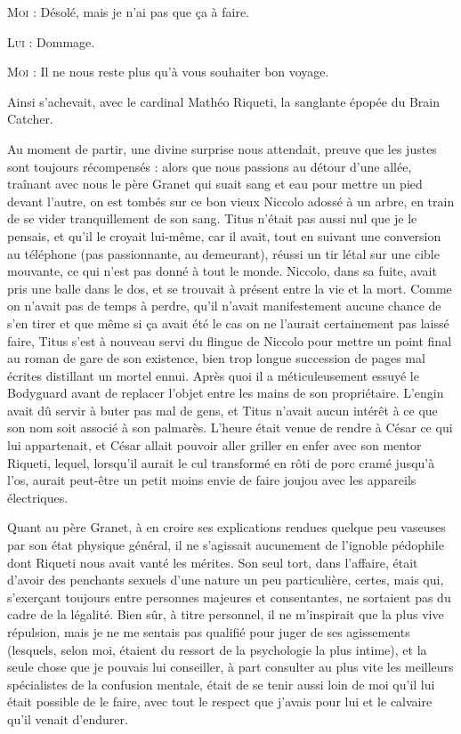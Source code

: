 \textsc{Moi} : Désolé, mais je n’ai pas que ça à faire.

\textsc{Lui} : Dommage.

\textsc{Moi} : Il ne nous reste plus qu’à vous souhaiter bon voyage.

Ainsi s’achevait, avec le cardinal Mathéo Riqueti, la sanglante épopée du Brain Catcher.

Au moment de partir, une divine surprise nous attendait, preuve que les justes sont toujours récompensés : alors que nous passions au détour d’une allée, traînant avec nous le père Granet qui suait sang et eau pour mettre un pied devant l’autre, on est tombés sur ce bon vieux Niccolo adossé à un arbre, en train de se vider tranquillement de son sang. Titus n’était pas aussi nul que je le pensais, et qu’il le croyait lui-même, car il avait, tout en suivant une conversion au téléphone (pas passionnante, au demeurant), réussi un tir létal sur une cible mouvante, ce qui n’est pas donné à tout le monde. Niccolo, dans sa fuite, avait pris une balle dans le dos, et se trouvait à présent entre la vie et la mort. Comme on n’avait pas de temps à perdre, qu’il n’avait manifestement aucune chance de s’en tirer et que même si ça avait été le cas on ne l’aurait certainement pas laissé faire, Titus s’est à nouveau servi du flingue de Niccolo pour mettre un point final au roman de gare de son existence, bien trop longue succession de pages mal écrites distillant un mortel ennui. Après quoi il a méticuleusement essuyé le Bodyguard avant de replacer l’objet entre les mains de son propriétaire. L’engin avait dû servir à buter pas mal de gens, et Titus n’avait aucun intérêt à ce que son nom soit associé à son palmarès. L’heure était venue de rendre à César ce qui lui appartenait, et César allait pouvoir aller griller en enfer avec son mentor Riqueti, lequel, lorsqu’il aurait le cul transformé en rôti de porc cramé jusqu’à l’os, aurait peut-être un petit moins envie de faire joujou avec les appareils électriques.

Quant au père Granet, à en croire ses explications rendues quelque peu vaseuses par son état physique général, il ne s’agissait aucunement de l’ignoble pédophile dont Riqueti nous avait vanté les mérites. Son seul tort, dans l’affaire, était d’avoir des penchants sexuels d’une nature un peu particulière, certes, mais qui, s’exerçant toujours entre personnes majeures et consentantes, ne sortaient pas du cadre de la légalité. Bien sûr, à titre personnel, il ne m’inspirait que la plus vive répulsion, mais je ne me sentais pas qualifié pour juger de ses agissements (lesquels, selon moi, étaient du ressort de la psychologie la plus intime), et la seule chose que je pouvais lui conseiller, à part consulter au plus vite les meilleurs spécialistes de la confusion mentale, était de se tenir aussi loin de moi qu’il lui était possible de le faire, avec tout le respect que j’avais pour lui et le calvaire qu’il venait d’endurer.

